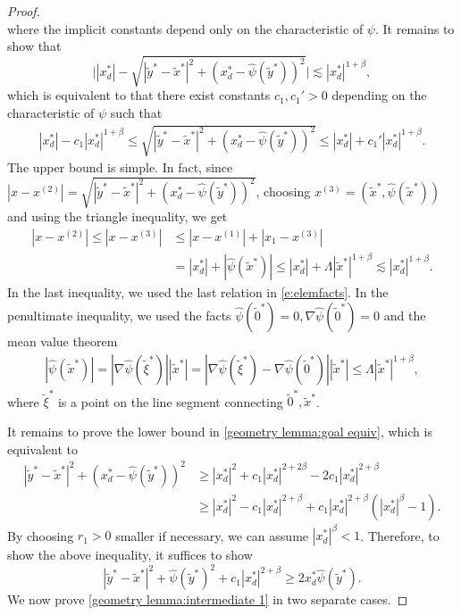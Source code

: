 \documentclass[12pt,a4paper]{amsart}
\numberwithin{equation}{section}
\theoremstyle{plain}
\newcommand{\be}{\beta}
\newcommand{\wt}{\widetilde}
\newcommand{\1}{\mathbbm{1}}
\begin{document}
\begin{proof}
\begin{equation}
\end{equation}
where the implicit constants depend only on the characteristic of $\psi$. It remains to show that
\begin{equation}\label{geometry lemma:goal}
    \big| |x_d^*| - \sqrt{|\wt y^* - \wt x^*|^2 + (x_d^* - \widehat{\psi}(\wt y^*))^2} \big| \lesssim |x_d^*|^{1+\beta},
\end{equation}
which is equivalent to that there exist constants $c_1, c_1'>0$ depending on the characteristic of $\psi$ such that
\begin{align}\label{geometry lemma:goal equiv}
 |x_d^*| - c_1 |x_d^*|^{1+\beta} \le \sqrt{|\wt y^* - \wt x^*|^2 + (x_d^* - \widehat{\psi}(\wt y^*))^2} \le  |x_d^*| + c_1' |x_d^*|^{1+\beta}.
\end{align}
The upper bound is simple. In fact, since $|x - x^{(2)}| = \sqrt{|\wt y^* - \wt x^*|^2 + (x_d^* - \widehat{\psi}(\wt y^*))^2}$, 
choosing $x^{(3)} = (\wt x^*,\widehat{\psi}(\wt x^*))$ and using the triangle inequality, we get
\begin{align*}
    |x-x^{(2)}| \le |x - x^{(3)}| & \le |x - x^{(1)}| + |x_1 - x^{(3)}| \\
    & = |x_d^*| + |\widehat{\psi}(\wt x^*)| \le |x_d^*| + 
    \Lambda |\wt x^*|^{1+ \beta}\lesssim|x^*_d|^{1+\beta}.
\end{align*}
In the last inequality, we used the last relation in \eqref{e:elemfacts}. In the penultimate inequality, we used the facts $\widehat{\psi}(\wt 0^*) = 0, \nabla \widehat{\psi}(\wt 0^*) = 0$ and the mean value theorem
\begin{align}\label{geometry lemma:intermediate mean value}
    |\widehat{\psi}(\wt x^*)| 
    = |\nabla \widehat{\psi}(\wt \xi^*)| |\wt x^*| = |\nabla \widehat{\psi}(\wt \xi^*) - \nabla \widehat{\psi}(\wt 0^*)| |\wt x^*| \le 
    \Lambda |\wt x^*|^{1+\beta},
\end{align}
where $\wt \xi^*$ is a point on the line segment connecting $\wt 0^*, \wt x^*$. 

It remains to prove the lower bound in 
\eqref{geometry lemma:goal equiv}, which is equivalent to 
\begin{align*}
    |\wt y^* - \wt x^*|^2 + (x_d^* - \widehat{\psi}(\wt y^*))^2 & \ge |x_d^*|^2 + c_1 |x_d^*|^{2+2\beta} - 2c_1|x_d^*|^{2+\beta} \\
    & \ge |x_d^*|^2 - c_1|x_d^*|^{2+\beta} + c_1|x_d^*|^{2+\beta} (|x_d^*|^\be - 1).
\end{align*}
By choosing $r_1>0$ smaller if necessary, we can assume $|x_d^*|^\be < 1$.  Therefore, to show the above inequality, it suffices to show
\begin{equation}\label{geometry lemma:intermediate 1}
     |\wt y^* - \wt x^*|^2  + \widehat{\psi}(\wt y^*)^2 + c_1|x_d^*|^{2+\beta} \ge 2 x_d^* \widehat{\psi}(\wt y^*). 
\end{equation} 
We now prove \eqref{geometry lemma:intermediate 1} in two separate cases.


\end{proof}
\end{document}

